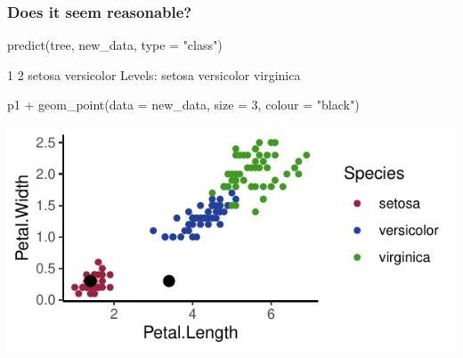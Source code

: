 \documentclass[a4paper]{article}\usepackage[]{graphicx}\usepackage[]{xcolor}
\makeatletter
\def\maxwidth{ %
  \ifdim\Gin@nat@width>\linewidth
    \linewidth
  \else
    \Gin@nat@width
  \fi
}
\makeatother
\begin{document}
\subsubsection{Does it seem reasonable?}
\begin{Schunk}
\begin{Sinput}
predict(tree, new_data, type = "class")
\end{Sinput}
\begin{Soutput}
         1          2 
    setosa versicolor 
Levels: setosa versicolor virginica
\end{Soutput}
\begin{Sinput}
p1 + geom_point(data = new_data, size = 3, colour = "black")
\end{Sinput}


{\centering \includegraphics[width=\maxwidth]{figure/listings-unnamed-chunk-435-1} 

}

\end{Schunk}
\end{document}
